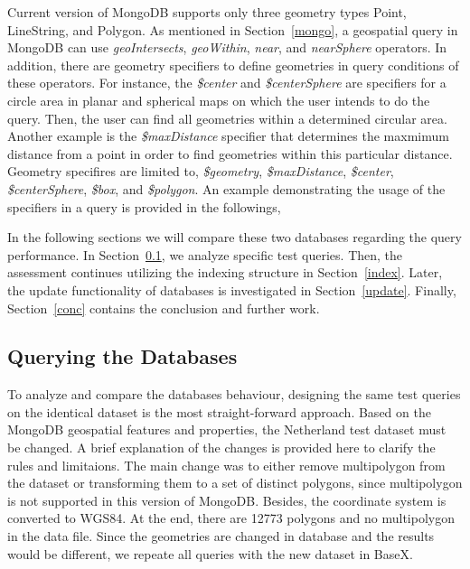 \documentclass[a4paper,12pt]{article}
\begin{document}
Current version of MongoDB supports only three geometry types Point, LineString, and Polygon. As mentioned in Section~\ref{mongo}, a geospatial query in MongoDB can use \textit{geoIntersects}, \textit{geoWithin}, \textit{near}, and \textit{nearSphere} operators. In addition, there are geometry specifiers to define geometries in query conditions of these operators. For instance, the \textit{\$center} and \textit{\$centerSphere} are specifiers for a circle area in planar and spherical maps on which the user intends to do the query. Then, the user can find all geometries within a determined circular area. Another example is the \textit{\$maxDistance} specifier that determines the maxmimum distance from a point in order to find geometries within this particular distance. Geometry specifires are limited to, \textit{\$geometry}, \textit{\$maxDistance}, \textit{\$center}, \textit{\$centerSphere}, \textit{\$box}, and \textit{\$polygon}. An example demonstrating the usage of the specifiers in a query is provided in the followings,
\vspace{10px}
 \vspace{10px}
 
In the following sections we will compare these two databases regarding the query performance. 
In Section~\ref{s.query}, we analyze specific test queries. Then, the assessment continues
utilizing the indexing structure in Section~\ref{index}. Later, the update functionality of databases is 
investigated in Section~\ref{update}. Finally, Section~\ref{conc} contains the conclusion and further work.

\subsection{Querying the Databases}
\label{s.query}
To analyze and compare the databases behaviour, designing the same test queries on the identical dataset is the most straight-forward approach. Based on the MongoDB geospatial features and properties, the Netherland test dataset must be changed. A brief explanation of the changes is provided here to clarify the rules and limitaions. The main change was to either remove multipolygon from the dataset or transforming them to a set of distinct polygons, since multipolygon is not supported in this version of MongoDB. Besides, the coordinate system is converted to WGS84. At the end, there are 12773 polygons and no multipolygon in the data file. Since the geometries are changed in database and the results would be different, we repeate all queries with the new dataset in BaseX.
\end{document}
